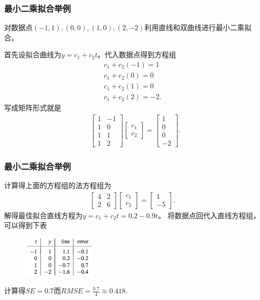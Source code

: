 \documentclass[10pt]{beamer}
\begin{document}
\begin{frame}
\frametitle{最小二乘拟合举例}
\begin{example}
对数据点$(-1,1), (0,0), (1,0), (2, -2)$利用直线和双曲线进行最小二乘拟合。
\end{example}
首先设拟合曲线为$y = c_1 + c_2 t$。代入数据点得到方程组
\begin{align}
c_1 + c_2 (-1) = 1 \nonumber \\
c_1 + c_2 (0) = 0 \nonumber \\
c_1 + c_2 (1) = 0 \nonumber \\
c_1 + c_2 (2) = -2.
\end{align}
写成矩阵形式就是
\begin{align}
&\left[ \begin{array}{cc}
     1    & -1 \\
     1    &   0 \\
     1    & 1  \\
     1    & 2                       
            \end{array} \right] 
\left[ \begin{array}{c} 
      c_1 \\ c_2 \end{array} \right] 
=
\left[ \begin{array}{c}
      1 \\ 0 \\ 0  \\ -2  \end{array} \right] .
\end{align}
\end{frame}


\begin{frame}
\frametitle{最小二乘拟合举例}
计算得上面的方程组的法方程组为
\begin{align}
\left[ \begin{array}{cc}
     4    & 2 \\
     2    &   6                 
            \end{array} \right] 
\left[ \begin{array}{c} 
      c_1 \\ c_2 \end{array} \right] 
=
\left[ \begin{array}{c}
      1 \\ -5   \end{array} \right] .
\end{align}
解得最佳拟合直线方程为$y = c_1 + c_2t = 0.2 - 0.9t$。
将数据点回代入直线方程组，可以得到下表
\begin{figure}
\includegraphics[width=3.5cm]{figs/4-1-2_Fitting_Data-4} 
\end{figure}
计算得$SE = 0.7$而$RMSE = \frac{0.7}{4} \approx 0.418$.
\end{frame}
\end{document}
